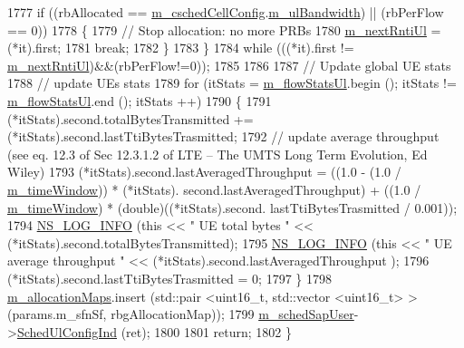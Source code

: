 \begin{DoxyCode}
1777       \textcolor{keywordflow}{if} ((rbAllocated == \hyperlink{classns3_1_1FdBetFfMacScheduler_a52a10018d36c6a2e69820346a327dfc9}{m\_cschedCellConfig}.\hyperlink{structns3_1_1FfMacCschedSapProvider_1_1CschedCellConfigReqParameters_a5ab5b102878e6e7e7727a14af4a64d2f}{m\_ulBandwidth}) || (rbPerFlow ==
       0))
1778         \{
1779           \textcolor{comment}{// Stop allocation: no more PRBs}
1780           \hyperlink{classns3_1_1FdBetFfMacScheduler_ade4e2b997a835d6205e7275d58884c41}{m\_nextRntiUl} = (*it).first;
1781           \textcolor{keywordflow}{break};
1782         \}
1783     \}
1784   \textcolor{keywordflow}{while} (((*it).first != \hyperlink{classns3_1_1FdBetFfMacScheduler_ade4e2b997a835d6205e7275d58884c41}{m\_nextRntiUl})&&(rbPerFlow!=0));
1785 
1786 
1787   \textcolor{comment}{// Update global UE stats}
1788   \textcolor{comment}{// update UEs stats}
1789   \textcolor{keywordflow}{for} (itStats = \hyperlink{classns3_1_1FdBetFfMacScheduler_ab32cc321792e04b643a0c976d79ba8b6}{m\_flowStatsUl}.begin (); itStats != \hyperlink{classns3_1_1FdBetFfMacScheduler_ab32cc321792e04b643a0c976d79ba8b6}{m\_flowStatsUl}.end (); itStats
      ++)
1790     \{
1791       (*itStats).second.totalBytesTransmitted += (*itStats).second.lastTtiBytesTrasmitted;
1792       \textcolor{comment}{// update average throughput (see eq. 12.3 of Sec 12.3.1.2 of LTE – The UMTS Long Term Evolution, Ed
       Wiley)}
1793       (*itStats).second.lastAveragedThroughput = ((1.0 - (1.0 / \hyperlink{classns3_1_1FdBetFfMacScheduler_acc6dde5313aae9a6a40d72e7c883689c}{m\_timeWindow})) * (*itStats).
      second.lastAveragedThroughput) + ((1.0 / \hyperlink{classns3_1_1FdBetFfMacScheduler_acc6dde5313aae9a6a40d72e7c883689c}{m\_timeWindow}) * (double)((*itStats).second.
      lastTtiBytesTrasmitted / 0.001));
1794       \hyperlink{group__logging_gafbd73ee2cf9f26b319f49086d8e860fb}{NS\_LOG\_INFO} (\textcolor{keyword}{this} << \textcolor{stringliteral}{" UE total bytes "} << (*itStats).second.totalBytesTransmitted);
1795       \hyperlink{group__logging_gafbd73ee2cf9f26b319f49086d8e860fb}{NS\_LOG\_INFO} (\textcolor{keyword}{this} << \textcolor{stringliteral}{" UE average throughput "} << (*itStats).second.lastAveragedThroughput
      );
1796       (*itStats).second.lastTtiBytesTrasmitted = 0;
1797     \}
1798   \hyperlink{classns3_1_1FdBetFfMacScheduler_a4263d235edb72f1e37dc659586eb0253}{m\_allocationMaps}.insert (std::pair <uint16\_t, std::vector <uint16\_t> > (params.m\_sfnSf, 
      rbgAllocationMap));
1799   \hyperlink{classns3_1_1FdBetFfMacScheduler_af2eac2234cc5c2b3d9999f9ec66911d3}{m\_schedSapUser}->\hyperlink{classns3_1_1FfMacSchedSapUser_a1b89636256701a84d990db7db8aea874}{SchedUlConfigInd} (ret);
1800 
1801   \textcolor{keywordflow}{return};
1802 \}
\end{DoxyCode}


